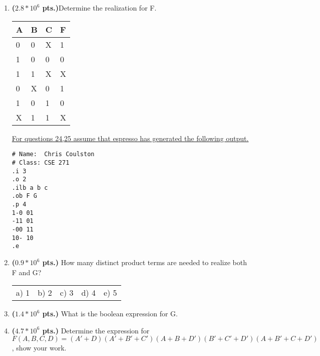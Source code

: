 \documentclass{article}
\begin{document}
\begin{enumerate}
\item {\bf ($2.8*10^6$ pts.)}Determine the \SOPmin realization for F.


\begin{tabular}{l|l|l||l}
A & B & C & F \\ \hline \hline
0 & 0 & X & 1 \\ \hline
1 & 0 & 0 & 0 \\ \hline
1 & 1 & X & X \\ \hline
0 & X & 0 & 1 \\ \hline
1 & 0 & 1 & 0 \\ \hline
X & 1 & 1 & X \\ 
\end{tabular}


\pagebreak
\underline{For questions 24,25 assume that espresso has generated the following output.}
\begin{verbatim}
# Name:  Chris Coulston
# Class: CSE 271
.i 3
.o 2
.ilb a b c
.ob F G
.p 4
1-0 01
-11 01
-00 11
10- 10
.e
\end{verbatim}

\item{\bf ($0.9*10^6$ pts.)}  How many distinct product terms are needed to realize both F and G?

\begin{tabular}{p{0.7in} p{0.7in} p{0.7in} p{0.7in} l}
a) 1 & b) 2 & c) 3 & d) 4 & e) 5
\end{tabular}


\item{\bf ($1.4*10^6$ pts.)} What is the boolean expression for G.

\item {\bf ($4.7*10^6$ pts.)} Determine the \POSmin expression for \\
$F(A,B,C,D)=(A'+D)(A'+B'+C')(A+B+D')(B'+C'+D')(A+B'+C+D')$,
show your work.

\end{enumerate}
\end{document}
